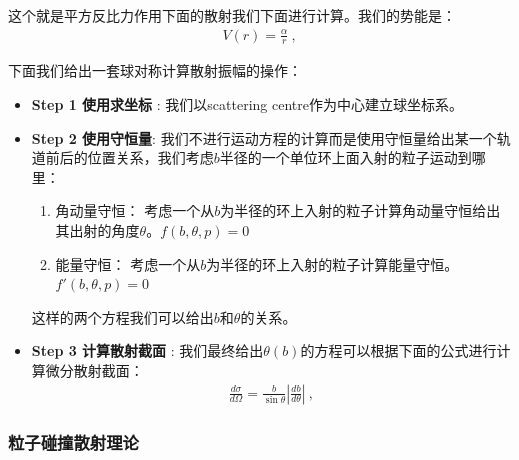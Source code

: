 
\bigskip
{}

这个就是平方反比力作用下面的散射我们下面进行计算。我们的势能是：
\begin{align}
  V(r)=\frac{\alpha}{r}\mathrm{~,}
\end{align}

\YL{[具体的计算作业里面有]}

\bigskip
{}

下面我们给出一套球对称计算散射振幅的操作：
\begin{itemize}
  \item \textbf{Step 1 使用求坐标} : 我们以scattering centre作为中心建立球坐标系。
  \item \textbf{Step 2 使用守恒量}:
    我们不进行运动方程的计算而是使用守恒量给出某一个轨道前后的位置关系，我们考虑$ b $半径的一个单位环上面入射的粒子运动到哪里：
    \begin{enumerate}
      \item 角动量守恒： 考虑一个从$ b $为半径的环上入射的粒子计算角动量守恒给出其出射的角度$ \theta $。$
        f(b,\theta, p) = 0 $
      \item 能量守恒： 考虑一个从$ b $为半径的环上入射的粒子计算能量守恒。$ f'(b,\theta, p) = 0 $
    \end{enumerate}
    这样的两个方程我们可以给出$ b $和$ \theta $的关系。
  \item \textbf{Step 3 计算散射截面} : 我们最终给出$ \theta(b) $的方程可以根据下面的公式进行计算微分散射截面：
    \begin{align}
      \frac{d\sigma}{d\Omega}=\frac{b}{\sin\theta}\left|\frac{db}{d\theta}\right|\mathrm{~,}
    \end{align}
\end{itemize}

\subsubsection{粒子碰撞散射理论}

